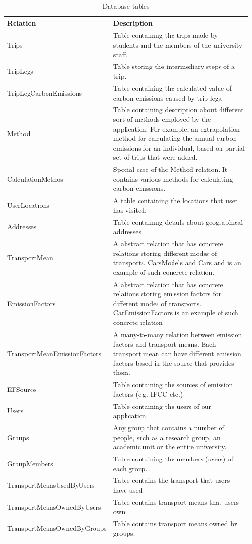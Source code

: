 \begin{table}
  \centering
  \begin{tabular}{|p{150px}|p{250px}|}
    \hline
    Relation  & Description\\
    \hline
    Trips & Table containing the trips made by students and the members of the university staff. \\ \hline
    TripLegs & Table storing the intermediary steps of a trip. \\ \hline
    TripLegCarbonEmissions & Table containing the calculated value of carbon emissions caused by trip legs. \\ \hline
    Method & Table containing description about different sort of methods employed by the application. For example, an extrapolation method for calculating the annual carbon emissions for an individual, based on partial set of trips that were added. \\ \hline
    CalculationMethos & Special case of the Method relation. It contains various methods for calculating carbon emissions. \\ \hline
    UserLocations & A table containing the locations that user has visited. \\ \hline
    Addresses & Table containing details about geographical addresses. \\ \hline
    TransportMean & A abstract relation that has concrete relations storing different modes of transports. CarsModels and Cars and is an example of such concrete relation. \\ \hline
    EmissionFactors &  A abstract relation that has concrete relations storing emission factors for different modes of transports. CarEmissionFactors is an example of such concrete relation \\ \hline
    TransportMeanEmissionFactors & A many-to-many relation between emission factors and transport means. Each transport mean can have different emission factors based in the source that provides them. \\ \hline
    EFSource & Table containing the sources of emission factors (e.g. IPCC etc.) \\ \hline
    Users & Table containing the users of our application. \\ \hline
    Groups & Any group that contains a number of people, such as a research group, an academic unit or the entire university. \\ \hline
    GroupMembers & Table containing the members (users) of each group. \\ \hline
    TransportMeansUsedByUsers & Table contains the transport that users have used. \\ \hline
    TransportMeansOwnedByUsers & Table contains transport means that users own. \\ \hline
    TransportMeansOwnedByGroups & Table contains transport means owned by groups. \\

    \hline

  \end{tabular}
  \caption{Database tables}\label{databaseTables}
\end{table}

